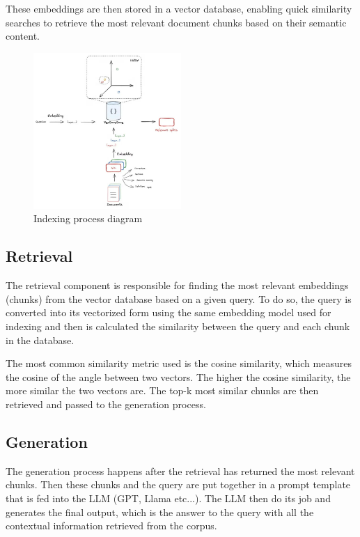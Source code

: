 \documentclass[conference]{IEEEtran}
\begin{document}
These embeddings are then stored in a vector database, enabling quick similarity
searches to retrieve the most relevant document chunks based on their semantic content.

\begin{figure}[htbp!]
    \centerline{\includegraphics[width=0.5\textwidth]{images/indexing_diagram.jpg}}
    \caption{Indexing process diagram \cite{bavli_rag_2024}}
    \label{fig:indexing_diagram}
\end{figure}

\subsection{Retrieval}
The retrieval component is responsible for finding the most relevant embeddings (chunks) from the vector database
based on a given query. To do so, the query is converted into its vectorized form using
the same embedding model used for indexing and then is calculated the similarity between the query and each chunk in the database.

The most common similarity metric used is the cosine similarity, which measures the cosine of the angle between two vectors.
The higher the cosine similarity, the more similar the two vectors are.
The top-k most similar chunks are then retrieved and passed to the generation process.

\subsection{Generation}
The generation process happens after the retrieval has returned the most relevant chunks.
Then these chunks and the query are put together in a prompt template that is fed into the LLM (GPT, Llama etc...).
The LLM then do its job and generates the final output, which is the answer to the query with all the
contextual information retrieved from the corpus.
\end{document}
